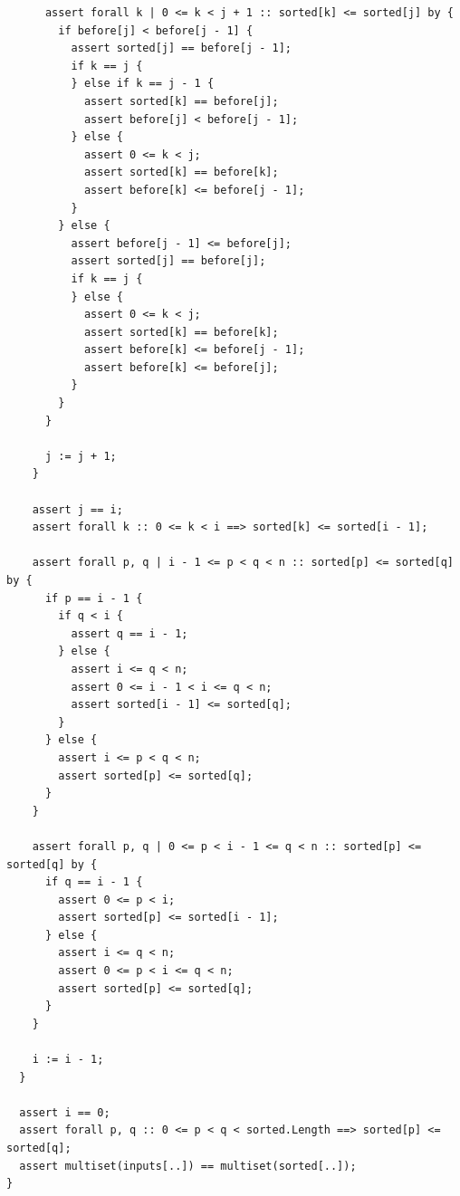 \documentclass{article}
\begin{document}
\begin{lstlisting}
      assert forall k | 0 <= k < j + 1 :: sorted[k] <= sorted[j] by {
        if before[j] < before[j - 1] {
          assert sorted[j] == before[j - 1];
          if k == j {
          } else if k == j - 1 {
            assert sorted[k] == before[j];
            assert before[j] < before[j - 1];
          } else {
            assert 0 <= k < j;
            assert sorted[k] == before[k];
            assert before[k] <= before[j - 1];
          }
        } else {
          assert before[j - 1] <= before[j];
          assert sorted[j] == before[j];
          if k == j {
          } else {
            assert 0 <= k < j;
            assert sorted[k] == before[k];
            assert before[k] <= before[j - 1];
            assert before[k] <= before[j];
          }
        }
      }

      j := j + 1;
    }

    assert j == i;
    assert forall k :: 0 <= k < i ==> sorted[k] <= sorted[i - 1];

    assert forall p, q | i - 1 <= p < q < n :: sorted[p] <= sorted[q] by {
      if p == i - 1 {
        if q < i {
          assert q == i - 1;
        } else {
          assert i <= q < n;
          assert 0 <= i - 1 < i <= q < n;
          assert sorted[i - 1] <= sorted[q];
        }
      } else {
        assert i <= p < q < n;
        assert sorted[p] <= sorted[q];
      }
    }

    assert forall p, q | 0 <= p < i - 1 <= q < n :: sorted[p] <= sorted[q] by {
      if q == i - 1 {
        assert 0 <= p < i;
        assert sorted[p] <= sorted[i - 1];
      } else {
        assert i <= q < n;
        assert 0 <= p < i <= q < n;
        assert sorted[p] <= sorted[q];
      }
    }

    i := i - 1;
  }

  assert i == 0;
  assert forall p, q :: 0 <= p < q < sorted.Length ==> sorted[p] <= sorted[q];
  assert multiset(inputs[..]) == multiset(sorted[..]);
}
\end{lstlisting}
\end{document}
